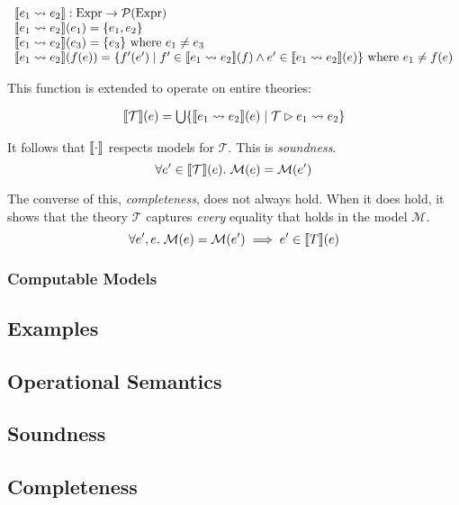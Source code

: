 \documentclass[runningheads]{llncs}
\begin{document}
\[
  \begin{array}{l}
    \llbracket e_1 \leadsto e_2 \rrbracket : \textnormal{Expr} \rightarrow \mathcal{P}(\textnormal{Expr})
    \\
    \llbracket e_1 \leadsto e_2 \rrbracket(e_1) = \{e_1, e_2\}
    \\
    \llbracket e_1 \leadsto e_2 \rrbracket(e_3) = \{e_3\}\textnormal{ where $e_1\neq e_3$}
    \\
    \llbracket e_1 \leadsto e_2 \rrbracket(f(e)) = \{ f'(e') \mid f' \in \llbracket e_1 \leadsto e_2 \rrbracket(f) \land e' \in \llbracket e_1 \leadsto e_2 \rrbracket(e) \}
        \textnormal{ where $e_1 \neq f(e)$}
  \end{array}
\]

\noindent
This function is extended to operate on entire theories:

\[
  \begin{array}{c}
    \llbracket \mathcal{T} \rrbracket(e) = \bigcup\{ \llbracket e_1 \leadsto e_2 \rrbracket(e) \mid \mathcal{T} \rhd e_1 \leadsto e_2 \}
  \end{array}
\]

\noindent
It follows that $\llbracket \cdot \rrbracket$ respects models for $\mathcal{T}$. This is \textit{soundness}.
\[
  \forall e' \in \llbracket \mathcal{T} \rrbracket(e).\; \mathcal{M}(e) = \mathcal{M}(e')
\]

\noindent
The converse of this, \textit{completeness}, does not always hold. When it does hold, it shows that the theory $\mathcal{T}$ captures \textit{every} equality that holds in the model $\mathcal{M}$.
\[
  \forall e', e.\; \mathcal{M}(e) = \mathcal{M}(e') \implies e' \in \llbracket T \rrbracket(e)
\]
%
%

\subsubsection{Computable Models}

\subsection{Examples}


\subsection{Operational Semantics}

\subsection{Soundness}

\subsection{Completeness}




\end{document}
